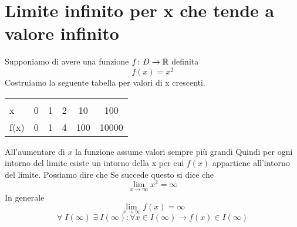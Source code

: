 \section{Limite infinito per x che tende a valore infinito}
Supponiamo di avere una funzione $f\colon D\to{}\mathbb{R}$ definita \[f(x)=x^2\] 
Costruiamo la seguente tabella per valori di x crescenti.
\begin{center}
	\begin{tabular}{@{}L*{5}{c}}
		\toprule
		&&&\\
		x& 0 & 1 &2&10&100\\
		\cmidrule(r){2-6} 
		f(x)	&0&1&4&100&10000\\
		\bottomrule
	\end{tabular}
\end{center}
All'aumentare di $x$ la funzione assume valori sempre più grandi
Quindi per ogni intorno del limite esiste un intorno della x per cui $f(x)$ appartiene all'intorno del limite. Possiamo dire che  Se succede questo si dice che \[\lim_{x\to \infty}x^2=\infty \]
In generale \begin{equation*}
\lim_{x\to \infty}f(x)=\infty
\end{equation*}
\begin{equation*}
\forall\; I(\infty)\; \exists\; I(\infty) : \forall x\in I(\infty) \longrightarrow f(x)\in I(\infty)
\end{equation*}
  